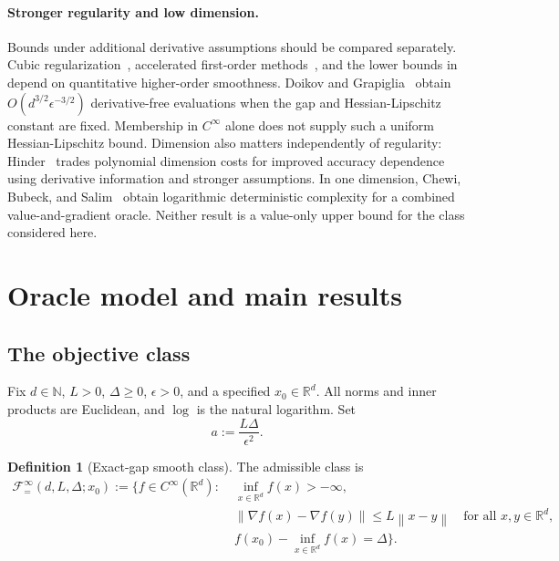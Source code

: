\documentclass[11pt]{article}
\numberwithin{equation}{section}
\theoremstyle{definition}
\newtheorem{definition}[definition]{Definition}
\theoremstyle{remark}
\newcommand{\R}{\mathbb{R}}
\newcommand{\N}{\mathbb{N}}
\newcommand{\norm}[1]{\left\lVert #1\right\rVert}
\newcommand{\Fclass}{\mathcal{F}_{=}^{\infty}}
\begin{document}
\paragraph{Stronger regularity and low dimension.}
Bounds under additional derivative assumptions should be compared
separately. Cubic regularization~\cite{NP2006}, accelerated first-order
methods~\cite{CDHS2017}, and the lower bounds in \citet{CDHS2021}
depend on quantitative higher-order smoothness. Doikov and
Grapiglia~\cite{DG2025} obtain $O(d^{3/2}\epsilon^{-3/2})$
derivative-free evaluations when the gap and Hessian-Lipschitz constant
are fixed. Membership in $C^\infty$ alone does not supply such a uniform
Hessian-Lipschitz bound.
Dimension also matters independently of regularity: Hinder~\cite{Hinder2018}
trades polynomial dimension costs for improved accuracy dependence using
derivative information and stronger assumptions. In one dimension,
Chewi, Bubeck, and Salim~\cite{CBS2023} obtain logarithmic deterministic
complexity for a combined value-and-gradient oracle. Neither result is a
value-only upper bound for the class considered here.

\section{Oracle model and main results}
\label{sec:model}

\subsection{The objective class}

Fix $d\in\N$, $L>0$, $\Delta\geq0$, $\epsilon>0$, and a specified
$x_0\in\R^d$. All norms and inner products are Euclidean, and $\log$ is the
natural logarithm. Set
\begin{equation}
    a:=\frac{L\Delta}{\epsilon^2}.
    \label{eq:a}
\end{equation}

\begin{definition}[Exact-gap smooth class]
The admissible class is
\begin{equation}
\begin{split}
\Fclass(d,L,\Delta;x_0):=\bigl\{f\in C^\infty(\R^d):\;&
    \inf_{x\in\R^d}f(x)>-\infty,\\
&\norm{\nabla f(x)-\nabla f(y)}\leq L\norm{x-y}
       \quad\text{for all }x,y\in\R^d,\\
& f(x_0)-\inf_{x\in\R^d}f(x)=\Delta\bigr\}.
\end{split}
\label{eq:class}
\end{equation}
\end{definition}
\end{document}
